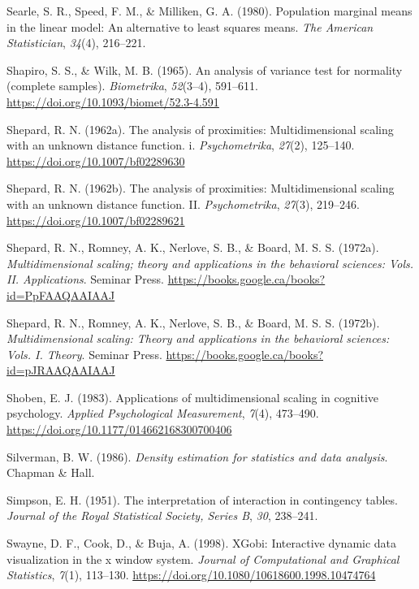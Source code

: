 \documentclass[
  letterpaper,
  10pt,
  krantz2]{krantz}
\newlength{\cslhangindent}
\newenvironment{CSLReferences}[2] %
 {\begin{list}{}{%
  \setlength{\itemindent}{0pt}
  \setlength{\leftmargin}{0pt}
  \setlength{\parsep}{0pt}
  \ifodd #1
   \setlength{\leftmargin}{\cslhangindent}
   \setlength{\itemindent}{-1\cslhangindent}
  \fi
  \setlength{\itemsep}{#2\baselineskip}}}
 {\end{list}}
\begin{document}
\begin{CSLReferences}{1}{0}
Searle, S. R., Speed, F. M., \& Milliken, G. A. (1980). Population
marginal means in the linear model: An alternative to least squares
means. \emph{The American Statistician}, \emph{34}(4), 216--221.

Shapiro, S. S., \& Wilk, M. B. (1965). An analysis of variance test for
normality (complete samples). \emph{Biometrika}, \emph{52}(3--4),
591--611. \url{https://doi.org/10.1093/biomet/52.3-4.591}

Shepard, R. N. (1962a). The analysis of proximities: Multidimensional
scaling with an unknown distance function. i. \emph{Psychometrika},
\emph{27}(2), 125--140. \url{https://doi.org/10.1007/bf02289630}

Shepard, R. N. (1962b). The analysis of proximities: Multidimensional
scaling with an unknown distance function. II. \emph{Psychometrika},
\emph{27}(3), 219--246. \url{https://doi.org/10.1007/bf02289621}

Shepard, R. N., Romney, A. K., Nerlove, S. B., \& Board, M. S. S.
(1972a). \emph{Multidimensional scaling; theory and applications in the
behavioral sciences: Vols. II. Applications}. Seminar Press.
\url{https://books.google.ca/books?id=PpFAAQAAIAAJ}

Shepard, R. N., Romney, A. K., Nerlove, S. B., \& Board, M. S. S.
(1972b). \emph{Multidimensional scaling: Theory and applications in the
behavioral sciences: Vols. I. Theory}. Seminar Press.
\url{https://books.google.ca/books?id=pJRAAQAAIAAJ}

Shoben, E. J. (1983). Applications of multidimensional scaling in
cognitive psychology. \emph{Applied Psychological Measurement},
\emph{7}(4), 473--490. \url{https://doi.org/10.1177/014662168300700406}

Silverman, B. W. (1986). \emph{Density estimation for statistics and
data analysis}. Chapman \& Hall.

Simpson, E. H. (1951). The interpretation of interaction in contingency
tables. \emph{Journal of the Royal Statistical Society, Series B},
\emph{30}, 238--241.

Swayne, D. F., Cook, D., \& Buja, A. (1998). XGobi: Interactive dynamic
data visualization in the x window system. \emph{Journal of
Computational and Graphical Statistics}, \emph{7}(1), 113--130.
\url{https://doi.org/10.1080/10618600.1998.10474764}


\end{CSLReferences}
\end{document}
